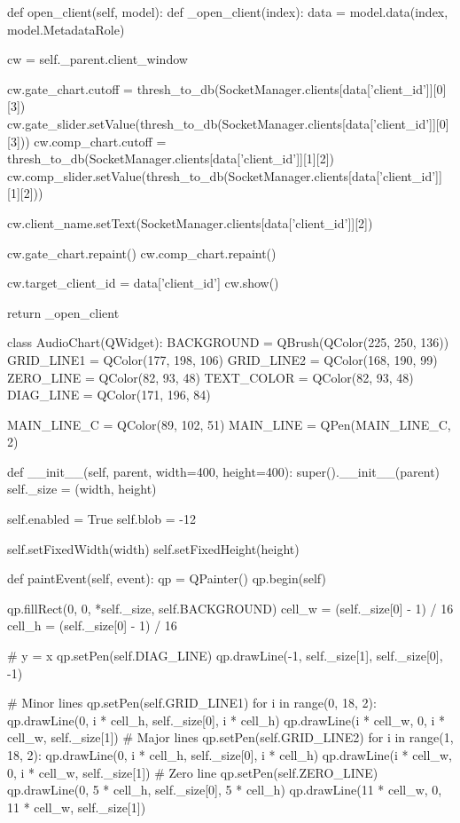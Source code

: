 \begin{pythoncode}
    def open_client(self, model):
        def _open_client(index):
            data = model.data(index, model.MetadataRole)

            cw = self._parent.client_window

            cw.gate_chart.cutoff = thresh_to_db(SocketManager.clients[data['client_id']][0][3])
            cw.gate_slider.setValue(thresh_to_db(SocketManager.clients[data['client_id']][0][3]))
            cw.comp_chart.cutoff = thresh_to_db(SocketManager.clients[data['client_id']][1][2])
            cw.comp_slider.setValue(thresh_to_db(SocketManager.clients[data['client_id']][1][2]))

            cw.client_name.setText(SocketManager.clients[data['client_id']][2])

            cw.gate_chart.repaint()
            cw.comp_chart.repaint()

            cw.target_client_id = data['client_id']
            cw.show()

        return _open_client


class AudioChart(QWidget):
    BACKGROUND = QBrush(QColor(225, 250, 136))
    GRID_LINE1 = QColor(177, 198, 106)
    GRID_LINE2 = QColor(168, 190, 99)
    ZERO_LINE = QColor(82, 93, 48)
    TEXT_COLOR = QColor(82, 93, 48)
    DIAG_LINE = QColor(171, 196, 84)

    MAIN_LINE_C = QColor(89, 102, 51)
    MAIN_LINE = QPen(MAIN_LINE_C, 2)

    def __init__(self, parent, width=400, height=400):
        super().__init__(parent)
        self._size = (width, height)

        self.enabled = True
        self.blob = -12

        self.setFixedWidth(width)
        self.setFixedHeight(height)

    def paintEvent(self, event):
        qp = QPainter()
        qp.begin(self)

        qp.fillRect(0, 0, *self._size, self.BACKGROUND)
        cell_w = (self._size[0] - 1) / 16
        cell_h = (self._size[0] - 1) / 16

        # y = x
        qp.setPen(self.DIAG_LINE)
        qp.drawLine(-1, self._size[1], self._size[0], -1)

        # Minor lines
        qp.setPen(self.GRID_LINE1)
        for i in range(0, 18, 2):
            qp.drawLine(0, i * cell_h, self._size[0], i * cell_h)
            qp.drawLine(i * cell_w, 0, i * cell_w, self._size[1])
        # Major lines
        qp.setPen(self.GRID_LINE2)
        for i in range(1, 18, 2):
            qp.drawLine(0, i * cell_h, self._size[0], i * cell_h)
            qp.drawLine(i * cell_w, 0, i * cell_w, self._size[1])
        # Zero line
        qp.setPen(self.ZERO_LINE)
        qp.drawLine(0, 5 * cell_h, self._size[0], 5 * cell_h)
        qp.drawLine(11 * cell_w, 0, 11 * cell_w, self._size[1])


\end{pythoncode}
